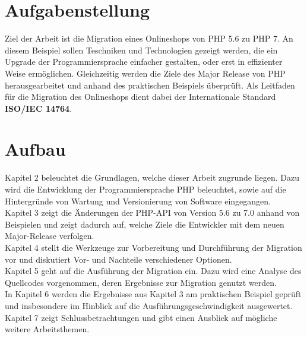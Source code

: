 \section{Aufgabenstellung}
Ziel der Arbeit ist die Migration eines Onlineshops von PHP 5.6 zu PHP 7. An diesem Beispiel sollen Teschniken und Technologien 
gezeigt werden, die ein Upgrade der Programmiersprache einfacher gestalten, oder erst in effizienter Weise ermöglichen. 
Gleichzeitig werden die Ziele des Major Release von PHP herausgearbeitet und anhand des praktischen Beispiels überprüft.
Als Leitfaden für die Migration des Onlineshops dient dabei der Internationale Standard \textbf{ISO/IEC 14764}.

\section{Aufbau}
Kapitel 2 beleuchtet die Grundlagen, welche dieser Arbeit zugrunde liegen. Dazu wird die Entwicklung der Programmiersprache PHP 
beleuchtet, sowie auf die Hintergründe von Wartung und Versionierung von Software eingegangen.\\
Kapitel 3 zeigt die Änderungen der PHP-API von Version 5.6 zu 7.0 anhand von Beispielen und zeigt dadurch auf, welche Ziele die Entwickler 
mit dem neuen Major-Release verfolgen.\\
Kapitel 4 stellt die Werkzeuge zur Vorbereitung und Durchführung der Migration vor und diskutiert Vor- und Nachteile verschiedener 
Optionen.\\
Kapitel 5 geht auf die Ausführung der Migration ein. Dazu wird eine Analyse des Quellcodes vorgenommen, deren Ergebnisse 
zur Migration genutzt werden. \\
In Kapitel 6 werden die Ergebnisse aus Kapitel 3 am praktischen Beispiel geprüft und insbesondere im Hinblick auf die 
Ausführungsgeschwindigkeit ausgewertet.\\
Kapitel 7 zeigt Schlussbetrachtungen und gibt einen Ausblick auf mögliche weitere Arbeitsthemen.

